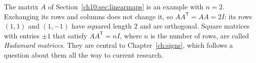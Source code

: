 The matrix $A$ of Section~\ref{ch10:sec:linearmaps} is an example with $n=2$. Exchanging its rows and columns does not change it, so $AA^{\mathsf T}=AA=2I$: its rows $(1,1)$ and $(1,-1)$ have squared length $2$ and are orthogonal. Square matrices with entries $\pm1$ that satisfy $AA^{\mathsf T}=nI$, where $n$ is the number of rows, are called \emph{Hadamard matrices}. They are central to Chapter~\ref{ch:signs}, which follows a question about them all the way to current research.
